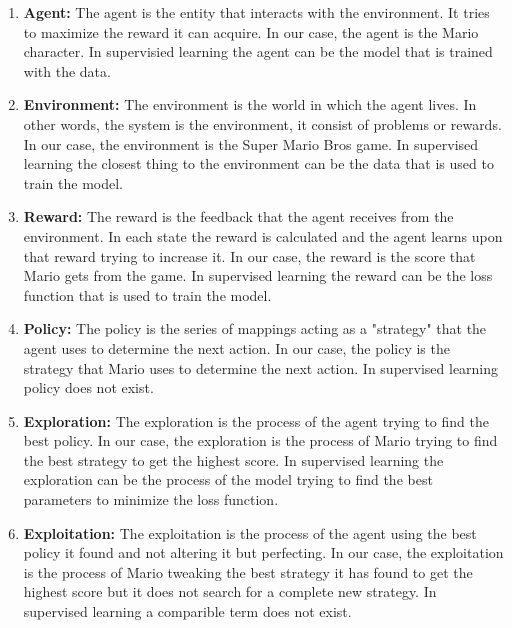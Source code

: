 \documentclass[3p,times,procedia]{elsarticle}
\begin{document}
\begin{enumerate}
    \item \textbf{Agent:} The agent is the entity that interacts with the environment. It tries to maximize the reward it can acquire. In our case, the agent is the Mario character. In supervisied learning the agent can be the model that is trained with the data. \\
    \item \textbf{Environment:} The environment is the world in which the agent lives. In other words, the system is the environment, it consist of problems or rewards. In our case, the environment is the Super Mario Bros game. In supervised learning the closest thing to the environment can be the data that is used to train the model. \\
    \item \textbf{Reward:} The reward is the feedback that the agent receives from the environment. In each state the reward is calculated and the agent learns upon that reward trying to increase it. In our case, the reward is the score that Mario gets from the game. In supervised learning the reward can be the loss function that is used to train the model. \\
    \item \textbf{Policy:} The policy is the series of mappings acting as a "strategy" that the agent uses to determine the next action. In our case, the policy is the strategy that Mario uses to determine the next action. In supervised learning policy does not exist. \\
    \item \textbf{Exploration:} The exploration is the process of the agent trying to find the best policy. In our case, the exploration is the process of Mario trying to find the best strategy to get the highest score. In supervised learning the exploration can be the process of the model trying to find the best parameters to minimize the loss function. \\
    \item \textbf{Exploitation:} The exploitation is the process of the agent using the best policy it found and not altering it but perfecting. In our case, the exploitation is the process of Mario tweaking the best strategy it has found to get the highest score but it does not search for a complete new strategy. In supervised learning a comparible term does not exist. \\
\end{enumerate}
\end{document}
